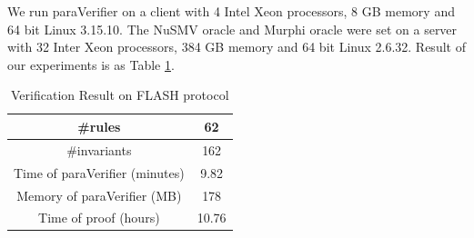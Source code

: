 \documentclass{llncs}
\begin{document}
We run {\sf paraVerifier} on a client with 4 Intel Xeon processors, 8 GB memory and 64 bit Linux 3.15.10. The NuSMV oracle and Murphi oracle were set on a server with 32 Inter Xeon processors, 384 GB memory and 64 bit Linux 2.6.32. Result of our experiments is as Table \ref{tab:flashRes}.


\begin{table}[!htbp]
  \centering
  \footnotesize
   \caption{Verification Result on FLASH protocol}
  \label{tab:flashRes}
  \vspace{-5pt}
  \begin{tabular}{|c|c|}
    \hline
    \#rules & 62\\
    \hline
    \#invariants & 162\\
    \hline
    Time of {\sf paraVerifier} (minutes) & 9.82\\
    \hline
    Memory of {\sf paraVerifier} (MB) & 178\\
    \hline
    Time of proof (hours) & 10.76\\
    \hline
  \end{tabular}

\end{table}






\end{document}
